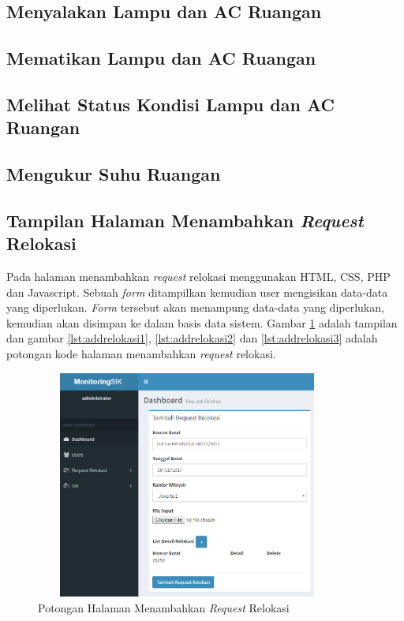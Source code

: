 \subsection{Menyalakan Lampu dan AC Ruangan}

\subsection{Mematikan Lampu dan AC Ruangan}

\subsection{Melihat Status Kondisi Lampu dan AC Ruangan}

\subsection{Mengukur Suhu Ruangan}


\subsection{Tampilan Halaman Menambahkan \textit{Request} Relokasi}
Pada halaman menambahkan \textit{request} relokasi menggunakan HTML, CSS, PHP dan Javascript. Sebuah \textit{form} ditampilkan kemudian user mengisikan data-data yang diperlukan. \textit{Form} tersebut akan menampung data-data yang diperlukan, kemudian akan disimpan ke dalam basis data sistem. Gambar \ref{figure:tambahReqRelokasi} adalah tampilan dan gambar \ref{lst:addrelokasi1}, \ref{lst:addrelokasi2} dan \ref{lst:addrelokasi3} adalah potongan kode halaman menambahkan \textit{request} relokasi.
\begin{figure}[h!]
\centerline
{\includegraphics[width=10cm,height=7.5cm]{bab5/addReqRelokasi.png}}
\caption{Potongan Halaman Menambahkan \textit{Request} Relokasi}
\label{figure:tambahReqRelokasi}
\end{figure}

